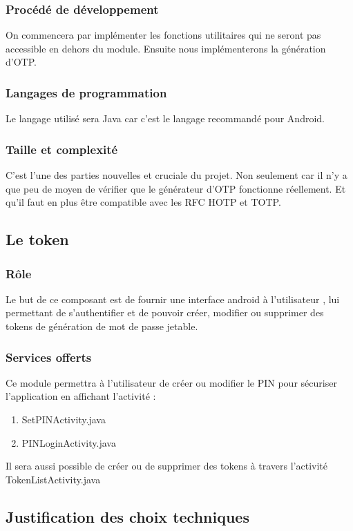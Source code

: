 \documentclass{"../../res/univ-projet"}
\begin{document}
    \subsubsection{Procédé de développement}
       On commencera par implémenter les fonctions utilitaires qui ne seront pas accessible en
dehors du module. Ensuite nous implémenterons la génération d'OTP.

    \subsubsection{Langages de programmation}
        Le langage utilisé sera Java car c'est le langage recommandé pour Android.

    \subsubsection{Taille et complexité}
C'est l'une des parties nouvelles et cruciale du projet. Non seulement car il n'y 
a que peu de moyen de vérifier que le générateur d'OTP fonctionne réellement. Et
qu'il faut en plus être compatible avec les RFC HOTP et TOTP.

\subsection{Le token}
	\subsubsection{Rôle}
	Le but de ce composant est de fournir une interface android à l’utilisateur , lui permettant de s’authentifier et de pouvoir créer, modifier ou supprimer des tokens de génération de mot de passe jetable.
	\subsubsection{Services offerts}
	Ce module permettra à l’utilisateur  de créer ou modifier le  PIN pour sécuriser l’application en affichant l’activité :
\begin{enumerate}
\item SetPINActivity.java
\item PINLoginActivity.java
\end{enumerate}

Il sera aussi possible de créer  ou de supprimer des tokens  à travers l’activité TokenListActivity.java
\subsection{Justification des choix techniques}
\end{document}
